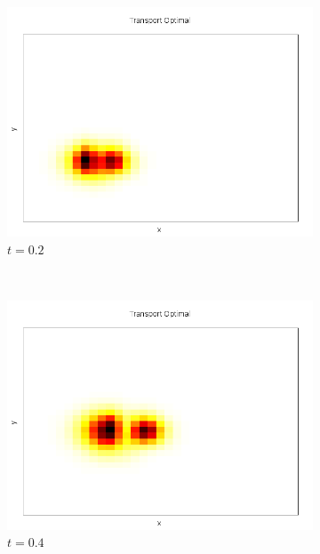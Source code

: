 \documentclass{beamer}
\begin{document}
\begin{frame}
\begin{figure}[!h]
	\begin{subfigure}[b]{0.22\linewidth}
	\includegraphics[width=\textwidth]{img/2DMixture/C_00007.png}
	\caption{$t=0.2$}
	\end{subfigure}
	~
	\begin{subfigure}[b]{0.22\linewidth}
	\includegraphics[width=\textwidth]{img/2DMixture/C_00014.png}
	\caption{$t=0.4$}
	\end{subfigure}
	~
	\begin{subfigure}[b]{0.22\linewidth}

\end{subfigure}
\end{figure}
\end{frame}
\end{document}
